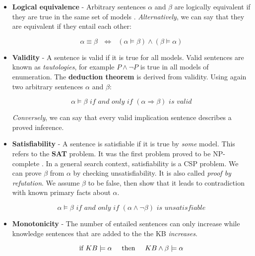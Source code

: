 \begin{itemize}
	\item \textbf{Logical equivalence} - Arbitrary sentences $\alpha$ and $\beta$ are logically equivalent if they are true in the same set of models \citep{russell2016artificial}. \textit{Alternatively}, we can say that they are equivalent if they entail each other:
	
\begin{equation}
\alpha \equiv \beta \text{  } \Leftrightarrow \text{  } (\alpha \models \beta) \wedge (\beta \models \alpha)
\label{eq:logical_equiv}
\end{equation}	
	
	\item \textbf{Validity} - A sentence is valid if it is true for all models. Valid sentences are known as \textit{tautologies}, for example $P \wedge \neg P$ is true in all models of enumeration. The \textbf{deduction theorem} is derived from validity. Using again two arbitrary sentences $\alpha$ and $\beta$:
	
\begin{equation}
\alpha \models \beta \textit{ if and only if }(\alpha \Rightarrow \beta) \textit{ is valid}
\label{eq:logical_validity}
\end{equation}	
	
\textit{Conversely}, we can say that every valid implication sentence describes a proved inference.
	
	\item \textbf{Satisfiability} - A sentence is satisfiable if it is true by \textit{some} model. This refers to the \textbf{SAT} problem. It was the first problem proved to be NP-complete \citep{russell2016artificial}. In a general search context, satisfiability  is a CSP problem. We can prove $\beta$ from $\alpha$ by checking unsatisfiability. It is also called \textit{proof by refutation}. We assume $\beta$ to be false, then show that it leads to contradiction with known primary facts about  $\alpha$. 

\begin{equation}
\alpha \models \beta \textit{ if and only if }(\alpha \wedge \neg \beta) \textit{ is unsatisfiable}
\label{eq:logical_satisfiability}
\end{equation}	

	\item \textbf{Monotonicity} - The number of entailed sentences can only increase while knowledge sentences that are added to the the KB \textit{increases}.
	

\begin{equation}
\text{if } KB \models \alpha \hspace{0.5cm} \text{then} \hspace{0.5cm} KB \wedge \beta \models \alpha  
\label{eq:logical_monotonicity}
\end{equation}	


\end{itemize}


